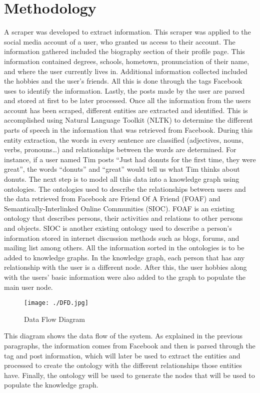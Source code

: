 \documentclass[conference]{IEEEtran}
\begin{document}
\section{Methodology}
A scraper was developed to extract information. This scraper was applied to the social media account of a user, who granted us access to their account. The information gathered included the biography section of their profile page. This information contained degrees, schools, hometown, pronunciation of their name, and where the user currently lives in. Additional information collected included the hobbies and the user’s friends. All this is done through the tags Facebook uses to identify the information. Lastly, the posts made by the user are parsed and stored at first to be later processed.
Once all the information from the users account has been scraped, different entities are extracted and identified. This is accomplished using Natural Language Toolkit (NLTK) to determine the different parts of speech in the information that was retrieved from Facebook. During this entity extraction, the words in every sentence are classified (adjectives, nouns, verbs, pronouns…) and relationships between the words are determined. For instance, if a user named Tim posts “Just had donuts for the first time, they were great”, the words “donuts” and “great” would tell us what Tim thinks about donuts. 
The next step is to model all this data into a knowledge graph using ontologies. The ontologies used to describe the relationships between users and the data retrieved from Facebook are Friend Of A Friend (FOAF) and Semantically-Interlinked Online Communities (SIOC). FOAF is an existing ontology that describes persons, their activities and relations to other persons and objects. SIOC is another existing ontology used to describe a person’s information stored in internet discussion methods such as blogs, forums, and mailing list among others. All the information sorted in the ontologies is to be added to knowledge graphs. In the knowledge graph, each person that has any relationship with the user is a different node. After this, the user hobbies along with the users’ basic information were also added to the graph to populate the main user node.   
 
\begin{figure}[htbp]
\centerline{\texttt{[image: ./DFD.jpg]}}
\caption{Data Flow Diagram}
\label{fig}
\end{figure}

This diagram shows the data flow of the system. As explained in the previous paragraphs, the information comes from Facebook and then is parsed through the tag and post information, which will later be used to extract the entities and processed to create the ontology with the different relationships those entities have. Finally, the ontology will be used to generate the nodes that will be used to populate the knowledge graph.
\end{document}
